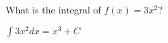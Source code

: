 \question What is the integral of $f(x) = 3x^2$?
\begin{solution}
$\int 3x^2 dx = x^3 + C$
\end{solution}
